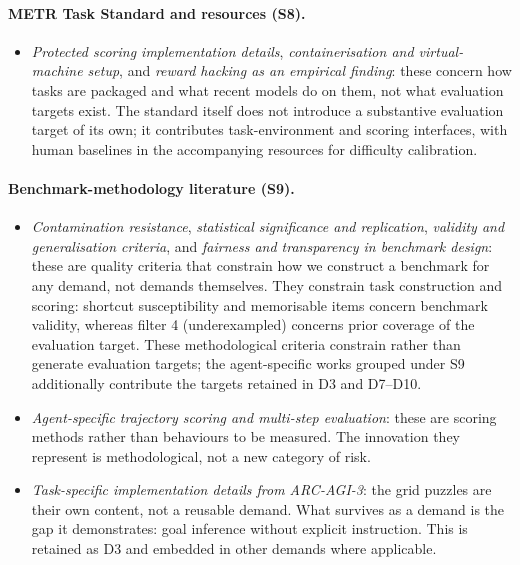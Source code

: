 \documentclass{article} %
\begin{document}
	\paragraph{METR Task Standard and resources (S8).}
	\begin{itemize}
		\item \emph{Protected scoring implementation details}, \emph{containerisation and virtual-machine setup}, and \emph{reward hacking as an empirical finding}: these concern how tasks are packaged and what recent models do on them, not what evaluation targets exist. The standard itself does not introduce a substantive evaluation target of its own; it contributes task-environment and scoring interfaces, with human baselines in the accompanying resources for difficulty calibration.
	\end{itemize}
	
	\paragraph{Benchmark-methodology literature (S9).}
	\begin{itemize}
		\item \emph{Contamination resistance}, \emph{statistical significance and replication}, \emph{validity and generalisation criteria}, and \emph{fairness and transparency in benchmark design}: these are quality criteria that constrain how we construct a benchmark for any demand, not demands themselves. They constrain task construction and scoring: shortcut susceptibility and memorisable items concern benchmark validity, whereas filter 4 (underexampled) concerns prior coverage of the evaluation target. These methodological criteria constrain rather than generate evaluation targets; the agent-specific works grouped under S9 additionally contribute the targets retained in D3 and D7--D10.
		\item \emph{Agent-specific trajectory scoring and multi-step evaluation}: these are scoring methods rather than behaviours to be measured. The innovation they represent is methodological, not a new category of risk.
		\item \emph{Task-specific implementation details from ARC-AGI-3}: the grid puzzles are their own content, not a reusable demand. What survives as a demand is the gap it demonstrates: goal inference without explicit instruction. This is retained as D3 and embedded in other demands where applicable.
	\end{itemize}
	
\end{document}

